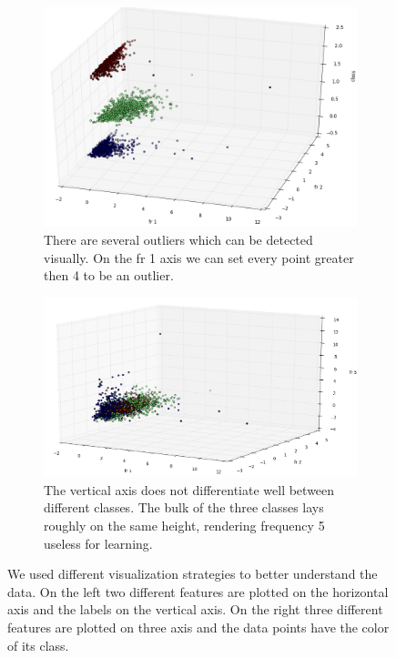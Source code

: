 \documentclass[a4paper, 11pt]{article}
\begin{document}
\begin{figure}[!b!]
 \centering 
\begin{subfigure}[b]{0.4\textwidth}
	\centering
	\includegraphics[width=\textwidth]{2_features.png} 
	\caption{There are several outliers which can be detected visually. On the fr 1 axis we can set every point greater then 4 to be an outlier.}
	\label{2Features}
\end{subfigure}
\hfill
\begin{subfigure}[b]{0.4\textwidth}
	\centering
	\includegraphics[width=\textwidth]{3_features.png} 
	\caption{The vertical axis does not differentiate well between different classes. The bulk of the three classes lays roughly on the same height, rendering frequency 5 useless for learning.}
	\label{3Features}
\end{subfigure}
\caption{We used different visualization strategies to better understand the data. On the left two different features are plotted on the horizontal axis and the labels on the vertical axis. On the right three different features are plotted on three axis and the data points have the color of its class.}
\end{figure}
\end{document}
